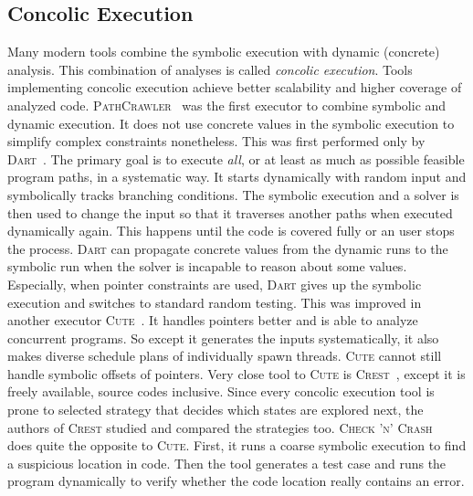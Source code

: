 \subsection{Concolic Execution}
Many modern tools combine the symbolic execution with dynamic (concrete)
analysis. This combination of analyses is called \emph{concolic
execution}. Tools implementing concolic execution achieve better scalability
and higher coverage of analyzed code. \textsc{PathCrawler}~\cite{pathcrawler}
was the first executor to combine symbolic and dynamic execution. It does not
use concrete values in the symbolic execution to simplify complex constraints
nonetheless. This was first performed only by \textsc{Dart}~\cite{dart}.  The
primary goal is to execute \emph{all}, or at least as much as possible
feasible program paths, in a systematic way. It starts dynamically with random
input and symbolically tracks branching conditions.  The symbolic execution
and a solver is then used to change the input so that it traverses another
paths when executed dynamically again. This happens until the code is covered
fully or an user stops the process.  \textsc{Dart} can propagate concrete
values from the dynamic runs to the symbolic run when the solver is incapable
to reason about some values. Especially, when pointer constraints are used,
\textsc{Dart} gives up the symbolic execution and switches to standard random
testing. This was improved in another executor \textsc{Cute}~\cite{cute}. It
handles pointers better and is able to analyze concurrent programs. So except
it generates the inputs systematically, it also makes diverse schedule plans
of individually spawn threads.  \textsc{Cute} cannot still handle symbolic
offsets of pointers. Very close tool to \textsc{Cute} is
\textsc{Crest}~\cite{crest}, except it is freely available, source
codes inclusive. Since every concolic execution tool is prone to selected
strategy that decides which states are explored next, the authors of
\textsc{Crest} studied and compared the strategies too.  \textsc{Check 'n'
Crash}~\cite{check_crash} does quite the opposite to \textsc{Cute}. First, it
runs a coarse symbolic execution to find a suspicious location in code. Then
the tool generates a test case and runs the program dynamically to verify
whether the code location really contains an error.

